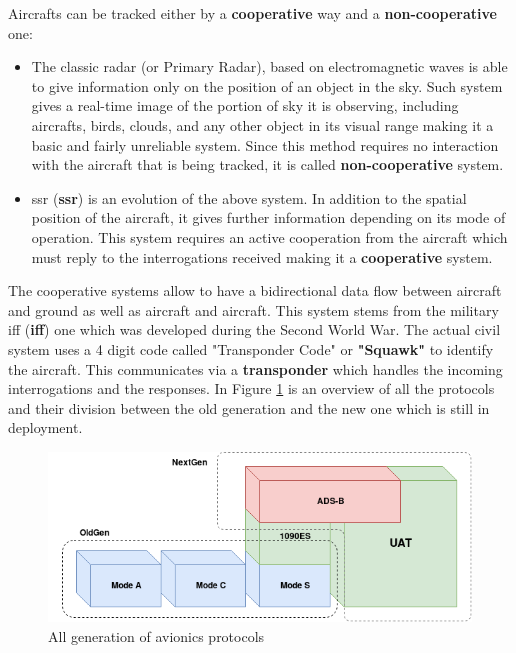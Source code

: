 \documentclass[../main.tex]{subfiles}
\begin{document}
Aircrafts can be tracked either by a \textbf{cooperative} way  and a \textbf{non-cooperative} one:

\begin{itemize}

  \item The classic radar (or Primary Radar), based on electromagnetic waves is able to give information only on the position of an object in the sky. Such system gives a real-time image of the portion of sky it is observing, including aircrafts, birds, clouds, and any other object in its visual range making it a basic and fairly unreliable system. Since this method requires no interaction with the aircraft that is being tracked, it is called \textbf{non-cooperative} system.
  \item \acrlong{ssr} (\textbf{\acrshort{ssr}}) is an evolution of the above system. In addition to the spatial position of the aircraft, it gives further information depending on its mode of operation. This system requires an active cooperation from the aircraft which must reply to the interrogations received making it a \textbf{cooperative} system.

\end{itemize}

The cooperative systems allow to have a bidirectional data flow between aircraft and ground as well as aircraft and aircraft. This system stems from the military \acrlong{iff} (\textbf{\acrshort{iff}}) one which was developed during the Second World War. The actual civil system uses a 4 digit code called "Transponder Code" or \textbf{"Squawk"} to identify the aircraft. This communicates via a \textbf{transponder} which handles the incoming interrogations and the responses. In Figure \ref{fig:allgen} is an overview of all the protocols and their division between the old generation and the new one which is still in deployment.

\begin{figure}[htp]
  \centering
  \includegraphics[scale=0.6]{images/allgen.png}
  \caption{All generation of avionics protocols}
  \label{fig:allgen}
\end{figure}
\end{document}
